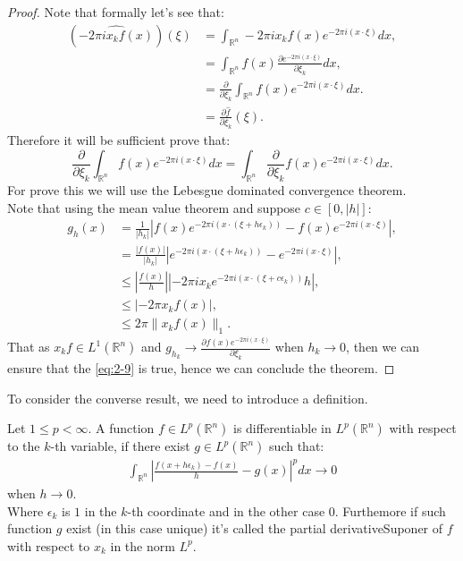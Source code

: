 \begin{proof} 
  Note that formally let's see that:
  \begin{align*}
    (\hat{-2\pi ix_kf(x)})(\xi)&=\int_{\mathbb{R}^{n}}-2\pi i x_kf(x)e^{-2\pi i(x\cdot \xi)}dx,\\
    &=\int_{\mathbb{R}^{n}}f(x)\frac{\partial e^{-2\pi i(x\cdot \xi)}}{\partial \xi_k}dx,\\
    &=\frac{\partial }{\partial \xi_k}\int_{\mathbb{R}^{n}}f(x)e^{-2\pi i(x\cdot \xi)}dx.\\
    &=\frac{\partial \hat{f}}{\partial \xi_k}(\xi).
  \end{align*}
  Therefore it will be sufficient prove that:
  \begin{equation}
    \frac{\partial}{\partial \xi_k}\int_{\mathbb{R}^{n}}f(x)e^{-2\pi i(x\cdot \xi)}dx=\int_{\mathbb{R}^{n}}\frac{\partial }{\partial \xi_k}f(x)e^{-2\pi i(x\cdot \xi)}dx.\label{eq:2-9}
  \end{equation}
  For prove this we will use the Lebesgue dominated convergence theorem.\\
  Note that using the mean value theorem and suppose $c\in [0,|h|]$:
  \begin{align*}
    g_h(x)&=\frac{1}{|h_k|}\left| f(x)e^{-2\pi i(x\cdot(\xi+h\epsilon_k))}-f(x)e^{-2\pi i(x\cdot\xi)} \right|,\\
    &=\frac{|f(x)|}{|h_k|}\left| e^{-2\pi i(x\cdot (\xi+h\epsilon_k))} - e^{-2\pi i(x\cdot\xi)} \right|,\\
    &\leq \left| \frac{f(x)}{h} \right|\left| -2\pi ix_ke^{-2\pi i(x\cdot (\xi+c\epsilon_k))}h \right|,\\
    &\leq \left|-2\pi x_kf(x)\right|,\\
    &\leq 2\pi \|x_k f(x)\|_{1}.
  \end{align*}
  That as $x_kf\in L^1(\mathbb{R}^{n})$ and $g_{h_k}\to \frac{\partial f(x)e^{-2\pi i(x\cdot \xi)}}{\partial \xi_k}$ when $h_k\to 0$, then we can ensure that the \cref{eq:2-9} is true, hence we can conclude the theorem.
\end{proof}
To consider the converse result, we need to introduce a definition.
\begin{definition}{}
	Let $1\leq p < \infty$. A function $f\in L^{p}(\mathbb{R}^n)$ is differentiable in $L^{p}(\mathbb{R}^n)$ with respect to the $k$-th variable, if there exist $g\in L^{p}(\mathbb{R}^n)$ such that:
	\begin{align*}
		\int_{\mathbb{R}^n}\left|\frac{f(x+h\epsilon_k)-f(x)}{h}-g(x)\right|^p dx\rightarrow0 
	\end{align*}
	when $h\to 0$.\\
	Where $\epsilon_k$ is $1$ in the $k$-th coordinate and in the other case $0$. Furthemore if such function $g$  exist (in this case unique) it's called the partial derivativeSuponer of $f$ with respect to $x_k$ in the norm $L^p$.
\end{definition}
